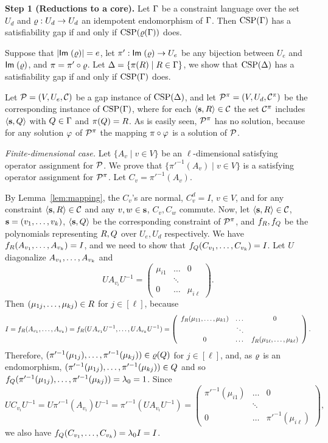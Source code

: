 \documentclass[11pt,letter]{article}
\begin{document}
{\bf Step 1 (Reductions to a core).}
Let $\Gamma$ be a constraint language over the set $U_d$ and $\varrho:U_d\to U_d$ an idempotent
endomorphism of $\Gamma$. Then ${\rm CSP}(\Gamma)$ has a satisfiability gap if and only if ${\rm CSP}(\varrho(\Gamma))$ does.

\smallskip

Suppose that $|{\sf Im}\;(\varrho)|=e$, let $\pi':{\sf Im}\;(\varrho)\to U_e$ be any bijection between $U_e$ and ${\sf Im}\;(\varrho)$, and $\pi=\pi'\circ\varrho$. Let $\Delta=\{\pi(R)\mid R\in\Gamma\}$, we show that ${\rm CSP}(\Delta)$ has a satisfiability gap if and only if ${\rm CSP}(\Gamma)$ does.

Let ${\mathcal P}=(V,U_e,{\mathcal C})$ be a gap instance of ${\rm CSP}(\Delta)$, and let ${\mathcal P}^\pi=(V,U_d,{\mathcal C}^\pi)$ be the corresponding instance of ${\rm CSP}(\Gamma)$, where for each $\langle {\bf s},R \rangle\in{\mathcal C}$ the set ${\mathcal C}^\pi$ includes $\langle {\bf s},Q \rangle$ with $Q\in\Gamma$ and $\pi(Q)=R$. As is easily seen, ${\mathcal P}^\pi$  has no solution, because for any solution $\varphi$ of ${\mathcal P}^\pi$ the mapping $\pi\circ\varphi$ is a solution of ${\mathcal P}$. 

{\it Finite-dimensional case.}
Let $\{A_v\mid v\in V\}$ be an $\ell$-dimensional satisfying operator assignment for ${\mathcal P}$. We prove that $\{\pi'^{-1}(A_v)\mid v\in V\}$ is a satisfying operator assignment for ${\mathcal P}^\pi$. Let $C_v=\pi'^{-1}(A_v)$.

By Lemma~\ref{lem:mapping}, the $C_v$'s are normal, $C_v^d=I$, $v\in V$,
and for any constraint $\langle {\bf s},R \rangle\in{\mathcal C}$ and any $v,w\in{\bf s}$, $C_v,C_w$ commute.
Now, let $\langle {\bf s},R \rangle\in{\mathcal C}$, ${\bf s}=(v _1,\ldots, v _{k})$, $\langle {\bf s},Q \rangle$ be the
corresponding constraint of ${\mathcal P}^\pi$, and $f_R,f_Q$ be the polynomials representing $R,Q$ over $U_e,U_d$ respectively. We have $f_R(A_{v_1},\ldots, A_{v_k})=I$, and we need to show that $f_Q(C_{v_1},\ldots, C_{v_k})=I$. Let $U$ diagonalize $A_{v_1},\ldots, A_{v_k}$ and
\[
UA_{v_i}U^{-1}=\left(\begin{array}{ccc}\mu_{i1}&\dots&0\\ &\ddots&\\ 0&\dots&\mu_{i\ell}\end{array}\right).
\]
Then $(\mu_{1j},\ldots,\mu_{kj})\in R$ for $j\in[\ell]$, because
\[
I=f_R(A_{v_1},\ldots, A_{v_k})=f_R(UA_{v_1}U^{-1},\ldots, UA_{v_k}U^{-1})= \left(\begin{array}{ccc}f_R(\mu_{11},\ldots,\mu_{k1})&\dots&0\\ &\ddots&\\ 0&\dots&f_R(\mu_{1\ell},\ldots,\mu_{k\ell})\end{array}\right).
\]
Therefore, $(\pi'^{-1}(\mu_{1j}),\ldots,\pi'^{-1}(\mu_{kj}))\in\varrho(Q)$ for $j\in[\ell]$, and, as $\varrho$ is an endomorphism, $(\pi'^{-1}(\mu_{1j}),\ldots,\pi'^{-1}(\mu_{kj}))\in Q$ and so $f_Q(\pi'^{-1}(\mu_{1j}),\ldots,\pi'^{-1}(\mu_{kj}))=\lambda_0=1$. Since 
\[
UC_{v_i}U^{-1}=U\pi'^{-1}(A_{v_i})U^{-1}=\pi'^{-1}(UA_{v_i}U^{-1})=\left(\begin{array}{ccc}\pi'^{-1}(\mu_{i1})&\dots&0\\ &\ddots&\\ 0&\dots&\pi'^{-1}(\mu_{i\ell})\end{array}\right),
\]
we also have $f_Q(C_{v_1},\ldots, C_{v_k})=\lambda_0I=I$.
\end{document}
